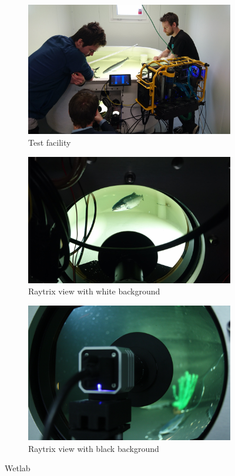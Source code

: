 \begin{figure}[h]
    \centering
    \begin{subfigure}{1\textwidth}
        \centering
        \includegraphics[width=.6\linewidth]{images/hardware/wetlab_overview}
        \caption{Test facility} 
    \end{subfigure}\hspace*{\fill}
    
    \medskip
    \begin{subfigure}{1\textwidth}
        \centering
        \includegraphics[width=.6\linewidth]{images/hardware/wetlab_fish_dome}
        \caption{Raytrix view with white background} 
    \end{subfigure}\hspace*{\fill}
    
    \medskip
    \begin{subfigure}{1\textwidth}
        \centering
        \includegraphics[width=.6\linewidth]{images/hardware/wetlab_raytrix}
        \caption{Raytrix view with black background} 
    \end{subfigure}\hspace*{\fill}
    \caption{Wetlab \cite{website:sealab}}
    \label{fig:wetlab}
\end{figure}









